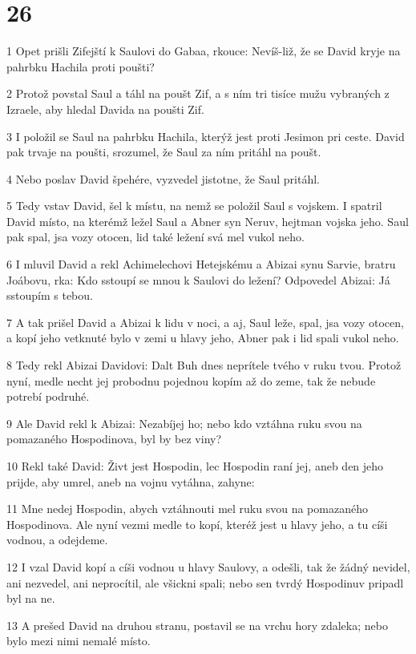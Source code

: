 \chapter{26}

\par 1 Opet prišli Zifejští k Saulovi do Gabaa, rkouce: Nevíš-liž, že se David kryje na pahrbku Hachila proti poušti?
\par 2 Protož povstal Saul a táhl na poušt Zif, a s ním tri tisíce mužu vybraných z Izraele, aby hledal Davida na poušti Zif.
\par 3 I položil se Saul na pahrbku Hachila, kterýž jest proti Jesimon pri ceste. David pak trvaje na poušti, srozumel, že Saul za ním pritáhl na poušt.
\par 4 Nebo poslav David špehére, vyzvedel jistotne, že Saul pritáhl.
\par 5 Tedy vstav David, šel k místu, na nemž se položil Saul s vojskem. I spatril David místo, na kterémž ležel Saul a Abner syn Neruv, hejtman vojska jeho. Saul pak spal, jsa vozy otocen, lid také ležení svá mel vukol neho.
\par 6 I mluvil David a rekl Achimelechovi Hetejskému a Abizai synu Sarvie, bratru Joábovu, rka: Kdo sstoupí se mnou k Saulovi do ležení? Odpovedel Abizai: Já sstoupím s tebou.
\par 7 A tak prišel David a Abizai k lidu v noci, a aj, Saul leže, spal, jsa vozy otocen, a kopí jeho vetknuté bylo v zemi u hlavy jeho, Abner pak i lid spali vukol neho.
\par 8 Tedy rekl Abizai Davidovi: Dalt Buh dnes neprítele tvého v ruku tvou. Protož nyní, medle necht jej probodnu pojednou kopím až do zeme, tak že nebude potrebí podruhé.
\par 9 Ale David rekl k Abizai: Nezabíjej ho; nebo kdo vztáhna ruku svou na pomazaného Hospodinova, byl by bez viny?
\par 10 Rekl také David: Živt jest Hospodin, lec Hospodin raní jej, aneb den jeho prijde, aby umrel, aneb na vojnu vytáhna, zahyne:
\par 11 Mne nedej Hospodin, abych vztáhnouti mel ruku svou na pomazaného Hospodinova. Ale nyní vezmi medle to kopí, kteréž jest u hlavy jeho, a tu cíši vodnou, a odejdeme.
\par 12 I vzal David kopí a cíši vodnou u hlavy Saulovy, a odešli, tak že žádný nevidel, ani nezvedel, ani neprocítil, ale všickni spali; nebo sen tvrdý Hospodinuv pripadl byl na ne.
\par 13 A prešed David na druhou stranu, postavil se na vrchu hory zdaleka; nebo bylo mezi nimi nemalé místo.
